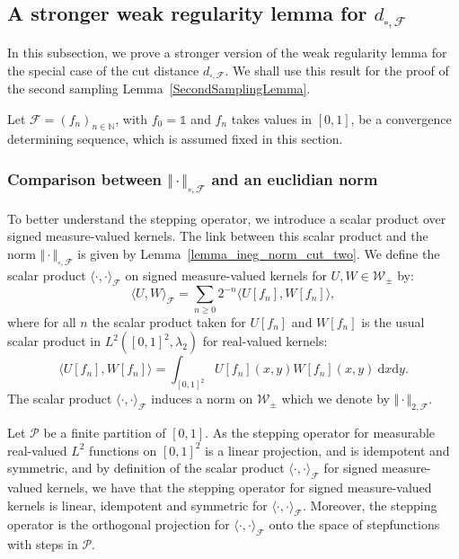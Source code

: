 \documentclass{amsart}
\theoremstyle{plain}
\theoremstyle{definition}
\newcommand{\signed}{\pm}
\newcommand{\cp}{\mathcal{P}}
\newcommand{\Kernel}{\mathcal{W}_{\signed}}
\newcommand{\dcutF}{d_{\square,\mathcal{F}}}
\newcommand{\NcutFSymbol}{\Vert\cdot\Vert_{\square,\mathcal{F}}}
\newcommand{\F}{\mathcal{F}}
\newcommand{\un}{\mathds{1}}
\newcommand{\N}{\mathbb{N}}
\newcommand{\drv}{\mathrm{d}}
\newcommand{\norm}[1]{\Vert#1\Vert}
\begin{document}
\subsection{A stronger weak regularity lemma for \texorpdfstring{$\dcutF$}{}}\label{section_stronger_weak_regularity_lemma}

In this subsection, we prove a stronger version of the weak regularity lemma
for the special case of the cut distance $\dcutF$.
We shall use this result for the proof of the second sampling Lemma~\ref{SecondSamplingLemma}.

Let $\F = (f_n )_{n\in\N}$, with $f_0=\un$ and $f_n$  takes values  in  $[0, 1]$, 
be a convergence determining
sequence, which is assumed fixed in  this section.

\subsubsection{Comparison between  \texorpdfstring{$\NcutFSymbol$}{} and an euclidian norm}

To better understand the stepping operator,
we introduce a scalar product over signed measure-valued kernels.
The link between this scalar product and the norm $\NcutFSymbol$
is given by Lemma~\ref{lemma_ineg_norm_cut_two}.
We define the scalar product $\langle \cdot, \cdot\rangle_{\F}$ on signed measure-valued kernels
for $U,W\in \Kernel$ by:
\begin{equation*}
\langle U,W \rangle_{\F} = \sum_{n\geq 0} 2^{-n} \langle U[f_n], W[f_n] \rangle  , 
\end{equation*}
where for all $n$ the scalar product taken for $U[f_n]$ and $W[f_n]$
is the usual scalar product in $L^2([0,1]^2, \lambda_2)$ for real-valued kernels:
\begin{equation*}
\langle U[f_n], W[f_n] \rangle 
= \int_{[0,1]^2} U[f_n](x,y) W[f_n](x,y) \ \drv x \drv y.
\end{equation*}
The scalar product $\langle \cdot, \cdot\rangle_{\F}$ 
induces a norm on $\Kernel$ which we denote by $\norm{\cdot}_{2,\F}$.

Let $\cp$ be a finite partition of $[0, 1]$. As the stepping operator for 
measurable real-valued $L^2$ functions on $[0,1]^2$
is a linear projection, and is idempotent and symmetric,
and by definition of the scalar product $\langle \cdot, \cdot\rangle_{\F}$
for signed measure-valued kernels,
we have that the stepping operator for signed measure-valued kernels
is linear, idempotent and symmetric for $\langle \cdot, \cdot\rangle_{\F}$.
Moreover, the stepping operator is the orthogonal projection for $\langle \cdot, \cdot\rangle_{\F}$
onto the space of stepfunctions with steps in $\mathcal{P}$.
\end{document}
